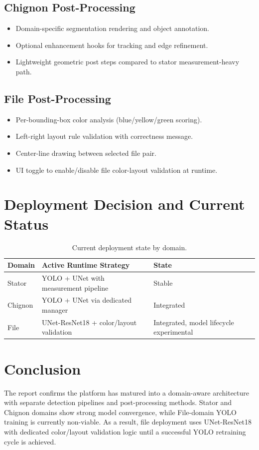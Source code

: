 \documentclass[12pt,a4paper]{article}
\begin{document}
\subsection{Chignon Post-Processing}
\begin{itemize}
    \item Domain-specific segmentation rendering and object annotation.
    \item Optional enhancement hooks for tracking and edge refinement.
    \item Lightweight geometric post steps compared to stator measurement-heavy path.
\end{itemize}

\subsection{File Post-Processing}
\begin{itemize}
    \item Per-bounding-box color analysis (blue/yellow/green scoring).
    \item Left-right layout rule validation with correctness message.
    \item Center-line drawing between selected file pair.
    \item UI toggle to enable/disable file color-layout validation at runtime.
\end{itemize}

\section{Deployment Decision and Current Status}

\begin{table}[H]
    \centering
    \begin{tabular}{lll}
        \toprule
        \textbf{Domain} & \textbf{Active Runtime Strategy} & \textbf{State} \\
        \midrule
        Stator & YOLO + UNet with measurement pipeline & Stable \\
        Chignon & YOLO + UNet via dedicated manager & Integrated \\
        File & UNet-ResNet18 + color/layout validation & Integrated, model lifecycle experimental \\
        \bottomrule
    \end{tabular}
    \caption{Current deployment state by domain.}
\end{table}

\section{Conclusion}

The report confirms the platform has matured into a domain-aware architecture with separate detection pipelines and post-processing methods. Stator and Chignon domains show strong model convergence, while File-domain YOLO training is currently non-viable. As a result, file deployment uses UNet-ResNet18 with dedicated color/layout validation logic until a successful YOLO retraining cycle is achieved.
\end{document}
